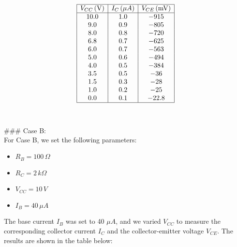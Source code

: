 \documentclass{article}
\begin{document}
\[
\begin{array}{|c|c|c|}
\hline
V_{CC} \, (\text{V}) & I_C \, (\mu A) & V_{CE} \, (\text{mV}) \\
\hline
10.0 & 1.0 & -915 \\
9.0  & 0.9 & -805 \\
8.0  & 0.8 & -720 \\
6.8  & 0.7 & -625 \\
6.0  & 0.7 & -563 \\
5.0  & 0.6 & -494 \\
4.0  & 0.5 & -384 \\
3.5  & 0.5 & -36 \\
1.5  & 0.3 & -28 \\
1.0  & 0.2 & -25 \\
0.0  & 0.1 & -22.8 \\
\hline
\end{array}
\]
\\ \\ 
### Case B: \\ 
For Case B, we set the following parameters:
\begin{itemize}
    \item \( R_B = 100 \, \Omega \)
    \item \( R_C = 2 \, k\Omega \)
    \item \( V_{CC} = 10 \, V \)
    \item \( I_B = 40 \, \mu A \)
\end{itemize}

The base current \( I_B \) was set to 40 \(\mu A\), and we varied \( V_{CC} \) to measure the corresponding collector current \( I_C \) and the collector-emitter voltage \( V_{CE} \). The results are shown in the table below:
\end{document}
